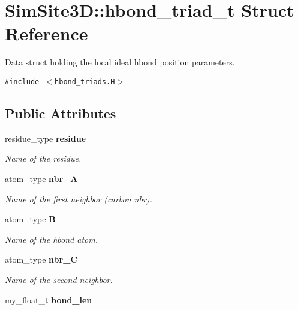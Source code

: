 \section{SimSite3D::hbond\_\-triad\_\-t Struct Reference}
\label{structSimSite3D_1_1hbond__triad__t}
Data struct holding the local ideal hbond position parameters.  


{\tt \#include $<$hbond\_\-triads.H$>$}

\subsection*{Public Attributes}
\begin{CompactItemize}
\item 
residue\_\-type \bf{residue}\label{structSimSite3D_1_1hbond__triad__t_1798707faec057ecf99c799925405515}

\begin{CompactList}\small\item\em Name of the residue. \item\end{CompactList}\item 
atom\_\-type \bf{nbr\_\-A}\label{structSimSite3D_1_1hbond__triad__t_c119967e6a52daeb787ee39542b77061}

\begin{CompactList}\small\item\em Name of the first neighbor (carbon nbr). \item\end{CompactList}\item 
atom\_\-type \bf{B}\label{structSimSite3D_1_1hbond__triad__t_7b75fba196d3ee7c932a6e2ef2f5e731}

\begin{CompactList}\small\item\em Name of the hbond atom. \item\end{CompactList}\item 
atom\_\-type \bf{nbr\_\-C}\label{structSimSite3D_1_1hbond__triad__t_c130e5b1271da5dde0b3ecceef40ca46}

\begin{CompactList}\small\item\em Name of the second neighbor. \item\end{CompactList}\item 
my\_\-float\_\-t \bf{bond\_\-len}\label{structSimSite3D_1_1hbond__triad__t_698e8f7f8227cabe2b32be68600d7ae4}


\end{CompactItemize}
